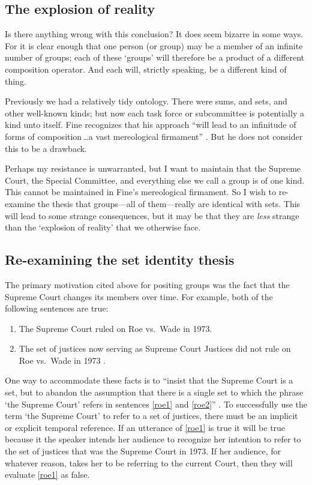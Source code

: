 \documentclass[11pt]{article}
\begin{document}
\begin{spacing}{1.5}
\subsection{The explosion of reality}
Is there anything wrong with this conclusion?  It does seem bizarre in
some ways.  For it is clear enough that one person (or group) may be a
member of an infinite number of groups; each of these `groups' will
therefore be a product of a different composition operator.  And each
will, strictly speaking, be a different kind of thing.

Previously we had a relatively tidy ontology.  There were sums, and
sets, and other well-known kinds; but now each task force or
subcommittee is potentially a kind unto itself.  Fine recognizes that
his approach ``will lead to an infinitude of forms of
composition\,\ldots a vast mereological firmament''
\citeyearpar[576]{fine2010}.  But he does not consider this to be a
drawback.

Perhaps my resistance is unwarranted, but I want to maintain that the
Supreme Court, the Special Committee, and everything else we call a
group is of one kind.  This cannot be maintained in Fine's
mereological firmament.  So I wish to re-examine the thesis that
groups---all of them---really are identical with sets.  This will lead
to some strange consequences, but it may be that they are {\em less}
strange than the `explosion of reality' that we otherwise face.

\subsection{Re-examining the set identity thesis}
\label{set-id}
The primary motivation cited above for positing groups was the fact
that the Supreme Court changes its members over time.  For example,
both of the following sentences are true:

\begin{enumerate}[label=(\arabic*)]
  \item The Supreme Court ruled on Roe vs.\ Wade in 1973. \label{roe1}

  \item The set of justices now serving as Supreme Court Justices did
    not rule on Roe vs.\ Wade in 1973
    \citep[135]{uzquiano2004a}. \label{roe2}
\end{enumerate}

One way to accommodate these facts is to ``insist that the Supreme
Court is a set, but to abandon the assumption that there is a single
set to which the phrase `the Supreme Court' refers in sentences
\ref{roe1} and \ref{roe2}'' \citep[138]{uzquiano2004a}.  To
successfully use the term `the Supreme Court' to refer to a set of
justices, there must be an implicit or explicit temporal reference.
If an utterance of \ref{roe1} is true it will be true because it the
speaker intends her audience to recognize her intention to refer to
the set of justices that was the Supreme Court in 1973.  If her
audience, for whatever reason, takes her to be referring to the
current Court, then they will evaluate \ref{roe1} as false.


\end{spacing}
\end{document}

